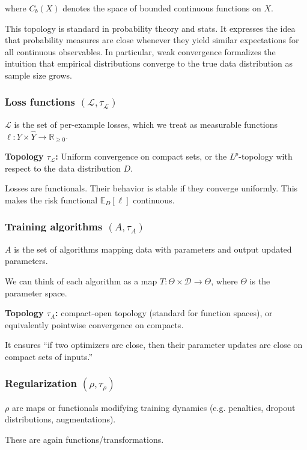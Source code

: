 \documentclass[12pt]{article}
\begin{document}
where $C_b(X)$ denotes the space of bounded continuous functions on $X$.

This topology is standard in probability theory and stats. It expresses the idea that probability measures are close whenever they yield similar expectations for all continuous observables. In particular, weak convergence formalizes the intuition that empirical distributions converge to the true data distribution as sample size grows.

\subsubsection{Loss functions $(\mathcal L, \tau_\mathcal L)$}

$\mathcal L$ is the set of per-example losses, which we treat as measurable functions $\ell: Y \times \hat{Y} \to \mathbb R_{\geq 0}$.

\textbf{Topology $\tau_\mathcal L$:} Uniform convergence on compact sets, or the $L^p$-topology with respect to the data distribution $D$.

Losses are functionals. Their behavior is stable if they converge uniformly. This makes the risk functional $\mathbb E_D[\ell]$ continuous.

\subsubsection{Training algorithms $(A, \tau_A)$}

$A$ is the set of algorithms mapping data with parameters and output updated parameters.

We can think of each algorithm as a map $T: \Theta \times \mathcal D \to \Theta$, where $\Theta$ is the parameter space.

\textbf{Topology $\tau_A$:} compact-open topology (standard for function spaces), or equivalently pointwise convergence on compacts.

It ensures “if two optimizers are close, then their parameter updates are close on compact sets of inputs.”

\subsubsection{Regularization $(\rho, \tau_\rho)$}

$\rho$ are maps or functionals modifying training dynamics (e.g. penalties, dropout distributions, augmentations).

These are again functions/transformations.
\end{document}
